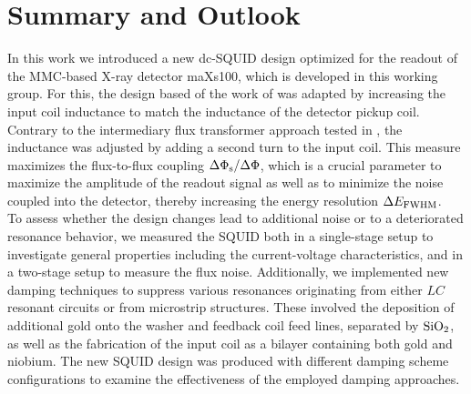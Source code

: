 \chapter{Summary and Outlook}

In this work we introduced a new dc-SQUID design optimized for the readout of the MMC-based X-ray detector maXs100, which is developed in this working group. For this, the design based of the work of \cite{Bauer2022} was adapted by increasing the input coil inductance to match the inductance of the detector pickup coil. Contrary to the intermediary flux transformer approach tested in \cite{Bauer2022}, the inductance was adjusted by adding a second turn to the input coil. This measure maximizes the flux-to-flux coupling $\Delta\Phi_{\rm s}/\Delta\Phi$, which is a crucial parameter to maximize the amplitude of the readout signal as well as to minimize the noise coupled into the detector, thereby increasing the energy resolution $\Delta E_{\rm FWHM}$. \\

To assess whether the design changes lead to additional noise or to a deteriorated resonance behavior, we measured the SQUID both in a single-stage setup to investigate general properties including the current-voltage characteristics, and in a two-stage setup to measure the flux noise. Additionally, we implemented new damping techniques to suppress various resonances originating from either $LC$ resonant circuits or from microstrip structures. These involved the deposition of additional gold onto the washer and feedback coil feed lines, separated by ${\rm SiO_2}$, as well as the fabrication of the input coil as a bilayer containing both gold and niobium. The new SQUID design was produced with different damping scheme configurations to examine the effectiveness of the employed damping approaches. \\

